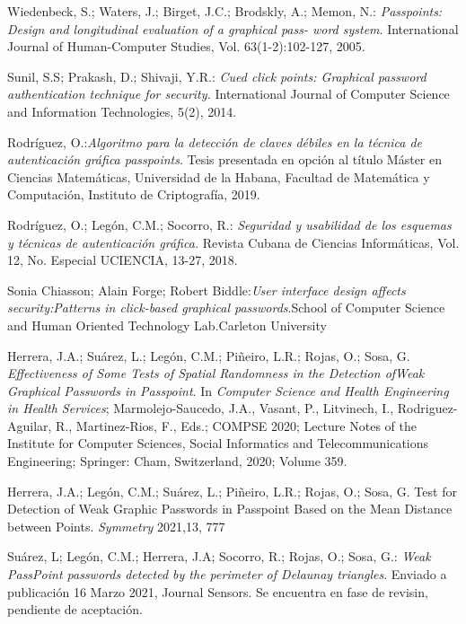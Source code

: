 \documentclass[12pt]{report}
\begin{document}

\begin{thebibliography}{9}
	\normalsize{
	 Wiedenbeck, S.; Waters, J.; Birget, J.C.; Brodskly, A.; Memon, N.:\textit{ Passpoints: Design and
	longitudinal evaluation of a graphical pass- word system}. International Journal of Human-Computer
	Studies, Vol. 63(1-2):102-127, 2005.

	 Sunil, S.S; Prakash, D.; Shivaji, Y.R.:\textit{ Cued click points: Graphical password authentication technique
	for security.} International Journal of Computer Science and Information Technologies, 5(2), 2014.

	 Rodríguez, O.:\textit{Algoritmo para la detección de claves débiles en la técnica de autenticación gráfica passpoints}. Tesis presentada en opción al título Máster en Ciencias Matemáticas, Universidad de la
	Habana, Facultad de Matemática y Computación, Instituto de Criptografía, 2019.

	 Rodríguez, O.; Legón, C.M.; Socorro, R.: \textit{Seguridad y usabilidad de los esquemas y técnicas de autenticación gráfica.} Revista Cubana de Ciencias Informáticas, Vol. 12, No. Especial UCIENCIA,
	13-27, 2018.
	
	 Sonia Chiasson; Alain Forge; Robert Biddle:\textit{User interface design affects security:Patterns in
	click-based graphical passwords}.School of Computer Science and Human Oriented Technology
	Lab.Carleton University
	
	Herrera, J.A.; Suárez, L.; Legón, C.M.; Piñeiro, L.R.; Rojas, O.; Sosa, G.\textit{ Effectiveness of Some Tests of Spatial Randomness in the Detection ofWeak Graphical Passwords in Passpoint}. In \textit{Computer Science and Health Engineering in Health Services}; Marmolejo-Saucedo, J.A., Vasant, P., Litvinech, I., Rodriguez-Aguilar, R., Martinez-Rios, F., Eds.; COMPSE 2020; Lecture Notes of the Institute for Computer Sciences, Social Informatics and Telecommunications Engineering; Springer: Cham, Switzerland, 2020; Volume 359.
	
	Herrera, J.A.; Legón, C.M.; Suárez, L.; Piñeiro, L.R.; Rojas, O.; Sosa, G. Test for Detection of Weak Graphic Passwords in Passpoint Based on the Mean Distance between Points.\textit{ Symmetry} 2021,13, 777
	
	Suárez, L; Legón, C.M.; Herrera, J.A; Socorro, R.; Rojas, O.; Sosa,
	G.: \textit{Weak PassPoint passwords detected by the perimeter of Delaunay triangles}. Enviado a publicación 16 Marzo 2021, Journal Sensors. Se	encuentra en fase de revisin, pendiente de aceptación.
	
}
\end{thebibliography}
\end{document}
